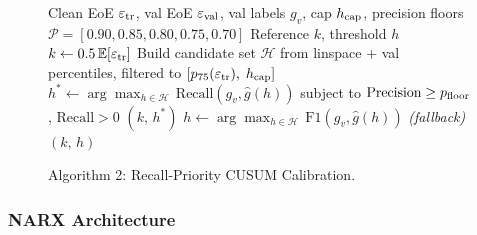 \documentclass[journal]{IEEEtran}
\begin{document}
\begin{figure}[!t]
\centering
\begin{minipage}{0.97\columnwidth}
\begin{algorithmic}[1]
\renewcommand{\algorithmicrequire}{\textbf{Input:}}
\renewcommand{\algorithmicensure}{\textbf{Output:}}
\REQUIRE Clean EoE $\varepsilon_{\rm tr}$, val EoE $\varepsilon_{\rm val}$,
         val labels $g_v$, cap $h_{\rm cap}$,
         precision floors $\mathcal{P}=[0.90,0.85,0.80,0.75,0.70]$
\ENSURE  Reference $k$, threshold $h$
\STATE $k \leftarrow 0.5\,\mathbb{E}[\varepsilon_{\rm tr}]$
\STATE Build candidate set $\mathcal{H}$ from linspace + val percentiles,
       filtered to $[p_{75}(\varepsilon_{\rm tr}),\;h_{\rm cap}]$
  \STATE $h^* \leftarrow \arg\max_{h\in\mathcal{H}}\,\text{Recall}(g_v,
         \hat{g}(h))$
         subject to $\text{Precision}\geq p_{\rm floor}$,
         $\text{Recall}>0$
    \RETURN $(k,\,h^*)$
  \ENDIF
\ENDFOR
\STATE $h \leftarrow \arg\max_{h\in\mathcal{H}}\,
       \text{F1}(g_v,\hat{g}(h))$
       \hfill\textit{(fallback)}
\RETURN $(k,\,h)$
\end{algorithmic}
\end{minipage}
\caption{Algorithm 2: Recall-Priority CUSUM Calibration.}
\label{alg:cal}
\end{figure}

\subsubsection{NARX Architecture}
\end{document}
